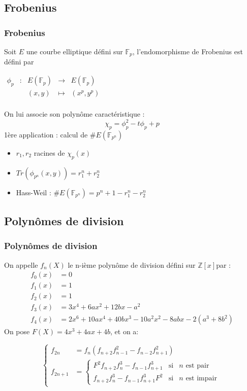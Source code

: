 \documentclass{beamer}
\begin{document}
\subsection{Frobenius}
\begin{frame}
\frametitle{Frobenius}
Soit $E$ une courbe elliptique défini sur $\mathbb{F}_p$, l'endomorphisme de Frobenius est défini par 

$\begin{array}{ccccc}
\phi_p & : & E(\mathbb{F}_p) & \to & E(\mathbb{F}_p) \\
 & & (x,y) & \mapsto & (x^p, y^p) \\
\end{array}$

On lui associe son polynôme caractéristique :
\begin{equation*}
\chi_p = \phi_p^2 - t \phi_p + p 
\end{equation*}
1ère application : calcul de $\#E(\mathbb{F}_{p^n})$
\begin{itemize}
\item $r_1,r_2$ racines de $\chi_p(x)$
\item $Tr(\phi_{p^n}(x,y)) = r_1^n + r_2^n$
\item Hass-Weil : $\#E(\mathbb{F}_{p^n}) = p^n +1 - r_1^n -r_2^n$
\end{itemize}
\end{frame}

\subsection{Polynômes de division}
\begin{frame}
\frametitle{Polynômes de division}
On appelle $f_n(X)$ le n-ième polynôme de division défini sur $\mathbb{Z}[x]$par : 
\begin{align*}
f_0(x) &= 0 \\
f_1(x) &= 1 \\
f_2(x) &= 1 \\
f_3(x) &= 3x^4 + 6ax^2 +12bx - a^2 \\
f_4(x) &= 2x^6 + 10ax^4 +40bx^3 - 10a^2x^2 - 8abx - 2(a^3 + 8b^2)
\end{align*}
On pose $F(X)= 4x^3 + 4ax + 4b$, et on a:

\begin{equation}
\left\lbrace
\begin{array}{ll}
f_{2n}& =  f_n(f_{n+2}f_{n-1}^2 - f_{n-2}f_{n+1}^2)   \\
f_{2n+1}& = \left\lbrace 
\begin{array}{ccc}
F^2f_{n+2}f_n^3 - f_{n-1}f_{n+1}^3 & \mbox{si} & n \text{ est pair}\\
f_{n+2}f_n^3 - f_{n-1}f_{n+1}^3F^2 & \mbox{si} & n \text{ est impair} \end{array}\right.

\end{array} \right.
\end{equation} 
\end{frame}
\end{document}
